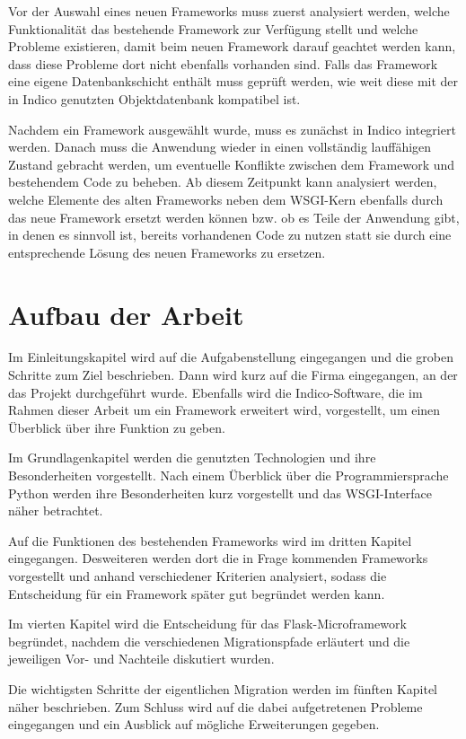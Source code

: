 Vor der Auswahl eines neuen Frameworks muss zuerst analysiert werden, welche Funktionalität das
bestehende Framework zur Verfügung stellt und welche Probleme existieren, damit beim neuen
Framework darauf geachtet werden kann, dass diese Probleme dort nicht ebenfalls vorhanden sind.
Falls das Framework eine eigene Datenbankschicht enthält muss geprüft werden, wie weit diese mit
der in Indico genutzten Objektdatenbank kompatibel ist.

Nachdem ein Framework ausgewählt wurde, muss es zunächst in Indico integriert werden. Danach muss
die Anwendung wieder in einen vollständig lauffähigen Zustand gebracht werden, um eventuelle
Konflikte zwischen dem Framework und bestehendem Code zu beheben. Ab diesem Zeitpunkt kann
analysiert werden, welche Elemente des alten Frameworks neben dem WSGI-Kern ebenfalls durch das neue
Framework ersetzt werden können bzw. ob es Teile der Anwendung gibt, in denen es sinnvoll ist,
bereits vorhandenen Code zu nutzen statt sie durch eine entsprechende Lösung des neuen Frameworks zu
ersetzen.


\section{Aufbau der Arbeit}

Im Einleitungskapitel wird auf die Aufgabenstellung eingegangen und die groben Schritte zum
Ziel beschrieben. Dann wird kurz auf die Firma eingegangen, an der das Projekt durchgeführt
wurde.
Ebenfalls wird die Indico-Software, die im Rahmen dieser Arbeit um ein Framework erweitert wird,
vorgestellt, um einen Überblick über ihre Funktion zu geben.

Im Grundlagenkapitel werden die genutzten Technologien und ihre Besonderheiten vorgestellt. Nach
einem Überblick über die Programmiersprache Python werden ihre Besonderheiten kurz
vorgestellt und das WSGI-Interface näher betrachtet.

Auf die Funktionen des bestehenden Frameworks wird im dritten Kapitel eingegangen. Desweiteren
werden dort die in Frage kommenden Frameworks vorgestellt und anhand verschiedener Kriterien
analysiert, sodass die Entscheidung für ein Framework später gut begründet werden kann.

Im vierten Kapitel wird die Entscheidung für das Flask-Microframework begründet, nachdem die
verschiedenen Migrationspfade erläutert und die jeweiligen Vor- und Nachteile diskutiert wurden.

Die wichtigsten Schritte der eigentlichen Migration werden im fünften Kapitel näher beschrieben. Zum
Schluss wird auf die dabei aufgetretenen Probleme eingegangen und ein Ausblick auf mögliche
Erweiterungen gegeben.


